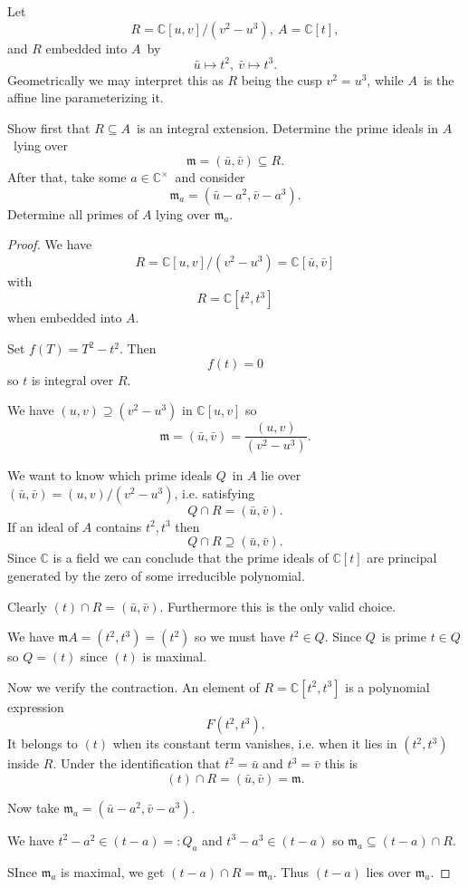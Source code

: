 \documentclass[11pt]{article}
\begin{document}
\begin{prob}
    Let 
    \[
        R = \mathbb C[u,v] / (v^2 - u^3), \ A = \mathbb C[t], 
    \]
    and $R$ embedded into $A$ by 
    \[
        \bar u \mapsto t^2, \ \bar v \mapsto t^3. 
    \]
    Geometrically we may interpret this as $R$ being 
    the cusp $v^2 = u^3$, while $A$ is the affine 
    line parameterizing it. 

    Show first that $R \subseteq A$ is an integral extension. 
    Determine the prime ideals in $A$ lying over 
    \[
        \mathfrak m = (\bar u, \bar v) \subseteq R. 
    \]
    After that, take some $a \in \mathbb C^\times$ and consider 
    \[
        \mathfrak m_a = (\bar u - a^2, \bar v - a^3). 
    \]
    Determine all primes of $A$ lying over $\mathfrak m_a$. 
\end{prob}
\begin{proof}
    We have 
    \[
        R = \mathbb C[u,v]/(v^2 - u^3) = 
        \mathbb C[\bar u, \bar v] 
    \]
    with 
    \[
        R = \mathbb C[t^2, t^3]
    \]
    when embedded into $A$. 

    Set $f(T) = T^2 - t^2$. Then 
    \[
        f(t) = 0 
    \]
    so $t$ is integral over $R$. 

    We have $(u,v) \supseteq (v^2 - u^3)$ in $\mathbb C[u,v]$ so 
    \[
        \mathfrak m = (\bar u, \bar v) = \frac{(u,v)}{(v^2 - u^3)}. 
    \]

    We want to know which prime ideals $Q$ in $A$ 
    lie over $(\bar u, \bar v) = (u,v)/(v^2 - u^3)$, i.e. 
    satisfying 
    \[
        Q \cap R = (\bar u, \bar v). 
    \]
    If an ideal of $A$ contains $t^2, t^3$ then 
    \[
        Q \cap R \supseteq (\bar u, \bar v). 
    \]
    Since $\mathbb C$ is a field we can conclude that 
    the prime ideals of $\mathbb C[t]$ are 
    principal generated by the zero of some irreducible 
    polynomial.

    Clearly $(t) \cap R = (\bar u, \bar v)$. Furthermore this 
    is the only valid choice. 

    We have $\mathfrak m A = (t^2, t^3) = (t^2)$ so we must have 
    $t^2 \in Q$. Since $Q$ is prime $t \in Q$ so 
    $Q = (t)$ since $(t)$ is maximal.

    Now we verify the contraction. 
    An element of $R = \mathbb C[t^2,t^3]$ is a polynomial expression
    \[
        F(t^2,t^3). 
    \]
    It belongs to $(t)$ when its constant term vanishes, i.e. 
    when it lies in $(t^2,t^3)$ inside $R$. Under the identification 
    that $t^2 = \bar u$ and $t^3 = \bar v$ this is 
    \[
        (t) \cap R = (\bar u, \bar v) = \mathfrak m.
    \]

    Now take $\mathfrak m_a = (\bar u - a^2, \bar v - a^3)$. 

    We have $t^2 - a^2 \in (t-a) =: Q_a$ and 
    $t^3 - a^3 \in (t-a)$ so 
    $\mathfrak m_a \subseteq (t-a) \cap R$.

    SInce $\mathfrak m_a$ is maximal, we get 
    $(t - a) \cap R = \mathfrak m_a$. Thus $(t-a)$ lies over 
    $\mathfrak m_a$. 
\end{proof}
\end{document}
